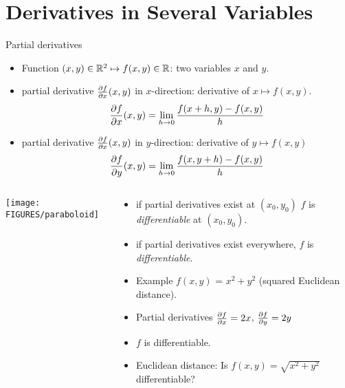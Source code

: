 \documentclass[8pt,dvipsnames]{beamer}
\begin{document}
\section{Derivatives in Several Variables}

\begin{frame}{Partial derivatives}
\begin{itemize}
    \item Function $(x,y)\in {\mathbb R}^2\mapsto f(x,y) \in {\mathbb R}$: two variables $x$ and $y$.\vfill
    \item partial derivative $\frac{\partial{f}}{\partial{x}}(x,y)$ in $x$-direction: derivative of $x\mapsto f(x,y)$. 
    {\small $$
    \frac{\partial{f}}{\partial{x}}(x,y)=\lim_{h\to 0} \frac{f(x+h,y)-f(x,y)}{h}
    $$}
    \item partial derivative $\frac{\partial{f}}{\partial{x}}(x,y)$ in $y$-direction: derivative of $y\mapsto f(x,y)$
    {\small $$
    \frac{\partial{f}}{\partial{y}}(x,y)=\lim_{h\to 0} \frac{f(x,y+h)-f(x,y)}{h}
    $$}
  \end{itemize}
  \begin{columns}
    \begin{column}{0.4\textwidth}
      \begin{center}
        \texttt{[image: FIGURES/paraboloid]}
      \end{center}
    \end{column}
    \begin{column}{0.7\textwidth}
      \begin{itemize}
        \item if partial derivatives exist at $(x_0,y_0)$ $f$ is \emph{differentiable} at $(x_0,y_0)$.
        \item  if partial derivatives exist everywhere, $f$ is \emph{differentiable}. 
        \item Example $f(x,y)$ = $x^2 + y^2$ (squared Euclidean distance).
        \item Partial derivatives
        $
        \frac{\partial{f}}{\partial{x}} = 2x
        $,
        $
        \frac{\partial{f}}{\partial{y}} = 2y
        $
        \item $f$ is differentiable.
        \item Euclidean distance: Is $f(x,y) = \sqrt{x^2 + y^2}$ differentiable?
      \end{itemize}
    \end{column}
  \end{columns}
\end{frame}
\end{document}
